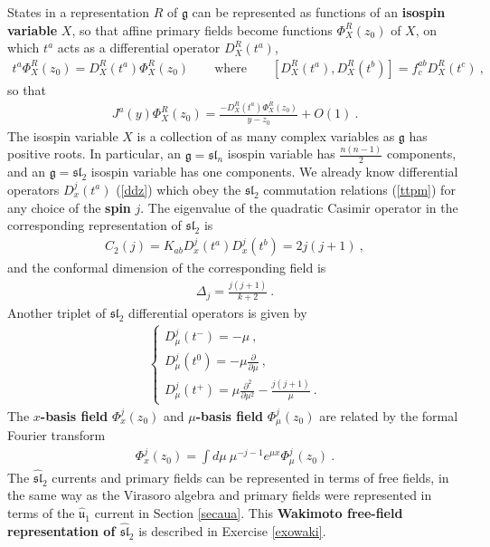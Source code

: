 \documentclass[12pt,a4paper,notitlepage]{report}
\newcommand \bla {\left\{\begin{array}{l} }
\newcommand \ela {\end{array}\right. }
\newcommand \p {\partial}
\newcommand \pp[1] {{\frac{\p}{\p #1}}}
\numberwithin{equation}{section}
\theoremstyle{break}
\begin{document}
States in a representation $R$ of $\mathfrak{g}$ can be represented as functions of an \textbf{\boldmath isospin variable} $X$, so that affine primary fields become functions $\Phi^R_X(z_0)$ of $X$, on which $t^a$ acts as a differential operator $D_X^R(t^a)$, 
\begin{align}
 t^a \Phi^R_X(z_0) = D_X^R(t^a) \Phi^R_X(z_0) \qquad \text{where} \qquad [D_X^R(t^a),D_X^R(t^b)] = f^{ab}_c D_X^R(t^c)\ ,
\label{tpdp}
\end{align}
so that 
\begin{align}
 J^a(y)\Phi^R_X(z_0) = \frac{-D^R_X(t^a)\Phi^R_X(z_0)}{y-z_0}+O(1)\ .
\label{jprx}
\end{align}
The isospin variable $X$ is a collection of as many complex variables as $\mathfrak{g}$ has positive roots. In particular, an $\mathfrak{g}=\mathfrak{sl}_n$ isospin variable has $\frac{n(n-1)}{2}$ components, and an $\mathfrak{g}=\mathfrak{sl}_2$ isospin variable has one components.
We already know differential operators $D^j_x(t^a)$ (\ref{ddz}) which 
obey the $\mathfrak{sl}_2$ commutation relations (\ref{ttpm}) for any choice of the 
\textbf{\boldmath spin} $j$. The eigenvalue of the quadratic Casimir operator in the corresponding representation of $\mathfrak{sl}_2$ is
\begin{align}
 C_2(j) =  K_{ab}D_x^j(t^a)D_x^j(t^b) = 2j(j+1)\ ,
\end{align}
and the conformal dimension of the corresponding field is
\begin{align}
 \Delta_j =\frac{j(j+1)}{k+2}\ .
\label{dj}
\end{align}
Another triplet of $\mathfrak{sl}_2$ differential operators is given by 
\begin{align}
\bla 
 D_\mu^j(t^-) = -\mu \ , \\  D_\mu^j(t^0) = -\mu\pp{\mu} \ , \\ D_\mu^j(t^+) = \mu\frac{\p^2}{\p\mu^2} -\frac{j(j+1)}{\mu}\ . \ela
\label{mub}
\end{align}
The \textbf{\boldmath $x$-basis field} $\Phi^j_x(z_0)$ and \textbf{\boldmath $\mu$-basis field} $\Phi^j_\mu(z_0)$ are related by the formal Fourier transform
\begin{align}
 \Phi_x^j(z_0) = \int d\mu\ \mu^{-j-1}e^{\mu x} \Phi_\mu^j(z_0)\ .
\label{emx}
\end{align}
The $\widehat{\mathfrak{sl}}_2$ currents and primary fields can be represented in terms of free fields, in the same way as the Virasoro algebra and primary fields were represented in terms of the $\hat{\mathfrak{u}}_1$ current in Section \ref{secaua}. This \textbf{Wakimoto free-field representation of $\widehat{\mathfrak{sl}}_2$} is described in Exercise \ref{exowaki}.
\end{document}
